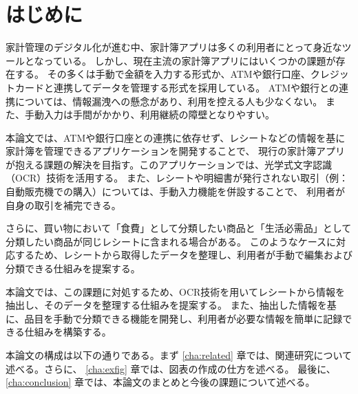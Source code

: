 \documentclass[main]{subfiles}
\begin{document}
\chapter{はじめに}
\label{cha:intro}

家計管理のデジタル化が進む中、家計簿アプリは多くの利用者にとって身近なツールとなっている。
しかし、現在主流の家計簿アプリにはいくつかの課題が存在する。
その多くは手動で金額を入力する形式か、ATMや銀行口座、クレジットカードと連携してデータを管理する形式を採用している。
ATMや銀行との連携については、情報漏洩への懸念があり、利用を控える人も少なくない。
また、手動入力は手間がかかり、利用継続の障壁となりやすい。

本論文では、ATMや銀行口座との連携に依存せず、レシートなどの情報を基に家計簿を管理できるアプリケーションを開発することで、
現行の家計簿アプリが抱える課題の解決を目指す。このアプリケーションでは、光学式文字認識（OCR）技術を活用する。
また、レシートや明細書が発行されない取引（例：自動販売機での購入）については、手動入力機能を併設することで、
利用者が自身の取引を補完できる。

さらに、買い物において「食費」として分類したい商品と「生活必需品」として分類したい商品が同じレシートに含まれる場合がある。
このようなケースに対応するため、レシートから取得したデータを整理し、利用者が手動で編集および分類できる仕組みを提案する。

本論文では、この課題に対処するため、OCR技術を用いてレシートから情報を抽出し、そのデータを整理する仕組みを提案する。
また、抽出した情報を基に、品目を手動で分類できる機能を開発し、利用者が必要な情報を簡単に記録できる仕組みを構築する。

本論文の構成は以下の通りである。まず \ref{cha:related} 章では、関連研究について述べる。さらに、
\ref{cha:exfig} 章では、図表の作成の仕方を述べる。
最後に、\ref{cha:conclusion} 章では、本論文のまとめと今後の課題について述べる。
\end{document}
